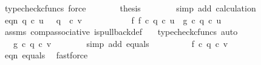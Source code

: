\begin{isabellebody}
\ {\isacharparenleft}{\kern0pt}typecheck{\isacharunderscore}{\kern0pt}cfuncs{\isacharcomma}{\kern0pt}\ force{\isacharparenright}{\kern0pt}\isanewline
\ \ \ \ \isamarkupfalse%
\ \isamarkupfalse%
\ {\isacharquery}{\kern0pt}thesis\isanewline
\ \ \ \ \ \ \isamarkupfalse%
\ {\isacharparenleft}{\kern0pt}simp\ add{\isacharcolon}{\kern0pt}\ calculation{\isacharparenright}{\kern0pt}\isanewline
\ \ \isamarkupfalse%
\ \isanewline
\isanewline
\ \ \isamarkupfalse%
\ eqn{}{\isacharcolon}{\kern0pt}\ {\isachardoublequoteopen}q{}\ {\isasymcirc}\isactrlsub c\ u\ {\isacharequal}{\kern0pt}\ \ q{}\ \ {\isasymcirc}\isactrlsub c\ v{\isachardoublequoteclose}\isanewline
\ \ \isamarkupfalse%
\ {\isacharminus}{\kern0pt}\ \isanewline
\ \ \ \ \isamarkupfalse%
\ f{}{\isacharcolon}{\kern0pt}\ {\isachardoublequoteopen}f\ {\isasymcirc}\isactrlsub c\ q{}\ {\isasymcirc}\isactrlsub c\ u\ {\isacharequal}{\kern0pt}\ g\ {\isasymcirc}\isactrlsub c\ q{}\ {\isasymcirc}\isactrlsub c\ u{\isachardoublequoteclose}\isanewline
\ \ \ \ \ \ \isamarkupfalse%
\ assms{\isacharparenleft}{\kern0pt}{}{\isacharparenright}{\kern0pt}\ comp{\isacharunderscore}{\kern0pt}associative{}\ is{\isacharunderscore}{\kern0pt}pullback{\isacharunderscore}{\kern0pt}def\ \ \isamarkupfalse%
\ {\isacharparenleft}{\kern0pt}typecheck{\isacharunderscore}{\kern0pt}cfuncs{\isacharcomma}{\kern0pt}\ auto{\isacharparenright}{\kern0pt}\isanewline
\ \ \ \ \isamarkupfalse%
\ \isamarkupfalse%
\ {\isachardoublequoteopen}{\isachardot}{\kern0pt}{\isachardot}{\kern0pt}{\isachardot}{\kern0pt}\ {\isacharequal}{\kern0pt}\ g\ {\isasymcirc}\isactrlsub c\ q{}\ {\isasymcirc}\isactrlsub c\ v{\isachardoublequoteclose}\isanewline
\ \ \ \ \ \ \isamarkupfalse%
\ {\isacharparenleft}{\kern0pt}simp\ add{\isacharcolon}{\kern0pt}\ equals{\isacharparenright}{\kern0pt}\isanewline
\ \ \ \ \isamarkupfalse%
\ \isamarkupfalse%
\ {\isachardoublequoteopen}{\isachardot}{\kern0pt}{\isachardot}{\kern0pt}{\isachardot}{\kern0pt}\ {\isacharequal}{\kern0pt}\ f\ {\isasymcirc}\isactrlsub c\ q{}\ {\isasymcirc}\isactrlsub c\ v{\isachardoublequoteclose}\isanewline
\ \ \ \ \ \ \isamarkupfalse%
\ eqn{}\ equals\ \isamarkupfalse%
\ fastforce\isanewline
\ \ \ \ \isamarkupfalse%

\end{isabellebody}
